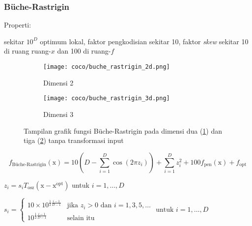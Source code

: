 \subsubsection*{Büche-Rastrigin}
\noindent Properti:
\begin{packed_item}
  \item sekitar $10^D$ optimum lokal, faktor pengkodisian sekitar 10, faktor \textit{skew} sekitar 10 di ruang ruang-$x$ dan 100 di ruang-$f$ 
\end{packed_item}
\begin{figure}[H]
	\centering
	\begin{subfigure}[b]{0.4\textwidth}
		\centering
		\texttt{[image: coco/buche\_rastrigin\_2d.png]}
		\caption{Dimensi 2}
		\label{fig:buche-rastrigin-2d}
	\end{subfigure}
	\hfill
	\begin{subfigure}[b]{0.4\textwidth}
		\centering
		\texttt{[image: coco/buche\_rastrigin\_3d.png]}
		\caption{Dimensi 3}
		\label{fig:buche-rastrigin-3d}
	\end{subfigure}
	\caption{Tampilan grafik fungsi Büche-Rastrigin pada dimensi dua (\cref{fig:buche-rastrigin-2d}) dan tiga (\cref{fig:buche-rastrigin-3d}) tanpa transformasi input}
	\label{fig:buche_rastrigin}
\end{figure}
\begin{equation}
  f_{\text{Büche-Rastrigin}}(\mathrm{x})=10(D-\sum_{i=1}^{D}\cos(2\pi z_i))+\sum_{i=1}^{D}z_i^2+100f_{\text{pen}}(\mathrm{x})+f_{\text{opt}}
\end{equation}
\begin{packed_item}
    \item $z_i=s_iT_{\text{osz}}(\mathrm{x}-\mathrm{x}^{\text{opt}})$ untuk $i=1,\ldots,D$
    \item $s_i=\begin{cases}
      10\times 10^{\frac{1}{2}\frac{i-1}{D-1}} & \text{jika }z_i > 0 \text{ dan } i=1,3,5,\ldots\\
      10^{\frac{1}{2}\frac{i-1}{D-1}} & \text{selain itu}
    \end{cases} \text{ untuk }i=1,\ldots,D$
\end{packed_item}

